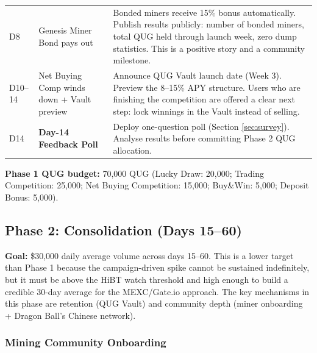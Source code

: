 \documentclass[11pt,a4paper]{article}
\begin{document}
\begin{center}
\begin{longtable}{C{1.4cm} L{3.5cm} L{8cm}}
  D8 & Genesis Miner Bond pays out & Bonded miners receive 15\% bonus automatically. Publish results publicly: number of bonded miners, total QUG held through launch week, zero dump statistics. This is a positive story and a community milestone. \\

  D10--14 & Net Buying Comp winds down + Vault preview & Announce QUG Vault launch date (Week 3). Preview the 8--15\% APY structure. Users who are finishing the competition are offered a clear next step: lock winnings in the Vault instead of selling. \\

  D14 & \textbf{Day-14 Feedback Poll} & Deploy one-question poll (Section \ref{sec:survey}). Analyse results before committing Phase 2 QUG allocation. \\

\end{longtable}
\end{center}

\textbf{Phase 1 QUG budget:} 70,000 QUG (Lucky Draw: 20,000; Trading Competition: 25,000; Net Buying Competition: 15,000; Buy\&Win: 5,000; Deposit Bonus: 5,000).

\subsection{Phase 2: Consolidation (Days 15--60)}

\textbf{Goal:} \$30,000 daily average volume across days 15--60. This is a lower target than Phase 1 because the campaign-driven spike cannot be sustained indefinitely, but it must be above the HiBT watch threshold and high enough to build a credible 30-day average for the MEXC/Gate.io approach. The key mechanisms in this phase are retention (QUG Vault) and community depth (miner onboarding + Dragon Ball's Chinese network).

\subsubsection{Mining Community Onboarding}
\end{document}
